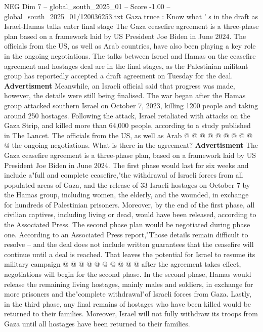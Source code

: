 \begin{textsample}{NEG Dim 7 – global\_south\_2025\_01 – Score -1.00 – global\_south\_2025\_01/120036253.txt}  \label{ex:f7_neg_112}
Gaza truce : Know what ' s in the draft as Israel-Hamas talks enter final stage The Gaza ceasefire agreement is a three-phase plan based on a framework laid by US President Joe Biden in June 2024.
The officials from the US, as well as Arab countries, have also been playing a key role in the ongoing negotiations.
The talks between Israel and Hamas on the ceasefire agreement and hostages deal are in the final stages, as the Palestinian militant group has reportedly accepted a draft agreement on Tuesday for the deal. \textbf{Advertisment} Meanwhile, an Israeli official said that progress was made, however, the details were still being finalised.
The war began after the Hamas group attacked southern Israel on October 7, 2023, killing 1200 people and taking around 250 hostages.
Following the attack, Israel retaliated with attacks on the Gaza Strip, and killed more than 64,000 people, according to a study published in The Lancet.
The officials from the US, as well as Arab @ @ @ @ @ @ @ @ @ @ the ongoing negotiations.
What is there in the agreement? \textbf{Advertisment} The Gaza ceasefire agreement is a three-phase plan, based on a framework laid by US President Joe Biden in June 2024.
The first phase would last for six weeks and include a"full and complete ceasefire,"the withdrawal of Israeli forces from all populated areas of Gaza, and the release of 33 Israeli hostages on October 7 by the Hamas group, including women, the elderly, and the wounded, in exchange for hundreds of Palestinian prisoners.
Moreover, by the end of the first phase, all civilian captives, including living or dead, would have been released, according to the Associated Press.
The second phase plan would be negotiated during phase one.
According to an Associated Press report,"Those details remain difficult to resolve -- and the deal does not include written guarantees that the ceasefire will continue until a deal is reached.
That leaves the potential for Israel to resume its military campaign @ @ @ @ @ @ @ @ @ @ after the agreement takes effect, negotiations will begin for the second phase.
In the second phase, Hamas would release the remaining living hostages, mainly males and soldiers, in exchange for more prisoners and the"complete withdrawal"of Israeli forces from Gaza.
Lastly, in the third phase, any final remains of hostages who have been killed would be returned to their families.
Moreover, Israel will not fully withdraw its troops from Gaza until all hostages have been returned to their families.

\end{textsample}
